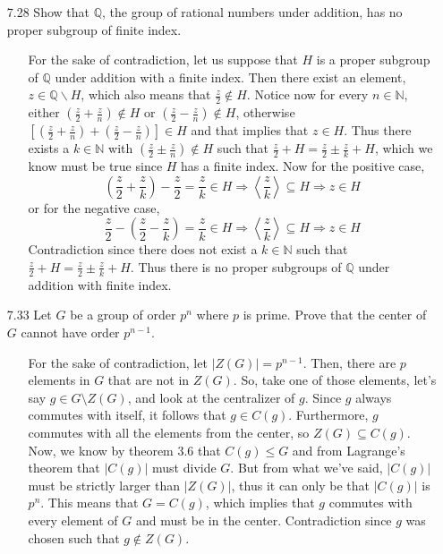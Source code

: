 \documentclass[12pt]{article}
\begin{document}
\begin{enumerate}
\item[7.28] Show that $\mathbb{Q}$, the group of rational numbers under addition, has no
proper subgroup of finite index.
\begin{enumerate}
\item[] For the sake of contradiction, let us suppose that $H$ is a proper subgroup of 
$\mathbb{Q}$ under addition with a finite index. Then there exist an 
element, $z \in \mathbb{Q}\backslash H$, which also means that $\frac{z}{2} \not\in H$. Notice now
for every $n \in \mathbb{N}$, either $(\frac{z}{2} + \frac{z}{n}) \not\in H$ or $(\frac{z}{2} - 
\frac{z}{n}) \not\in H$, otherwise $[(\frac{z}{2} + \frac{z}{n}) + (\frac{z}{2} - \frac{z}{n})] \in H$
and that implies that $z \in H$. Thus there exists a $k \in \mathbb{N}$ with
$(\frac{z}{2} \pm \frac{z}{n}) \not\in H$ such that $\frac{z}{2} + H = \frac{z}{2} \pm \frac{z}{k} + H$, which
we know must be true since $H$ has a finite index. 
Now for the positive case, 
\[ 
\left(\frac{z}{2} + \frac{z}{k}\right) - \frac{z}{2} = \frac{z}{k} \in H 
\Rightarrow \left\langle \frac{z}{k} \right\rangle \subseteq H \Rightarrow z \in H
\]
or for the negative case,
\[ 
\frac{z}{2} - \left(\frac{z}{2} - \frac{z}{k}\right) = \frac{z}{k} \in H 
\Rightarrow \left\langle \frac{z}{k} \right\rangle \subseteq H \Rightarrow z \in H
\]
Contradiction since there does not exist a $k \in \mathbb{N}$ such that \\
$\frac{z}{2} + H = \frac{z}{2} \pm \frac{z}{k} + H$. Thus there is no proper subgroups of 
$\mathbb{Q}$ under addition with finite index.
\end{enumerate}

\item[7.33] Let $G$ be a group of order $p^n$ where $p$ is prime. Prove that the center
of $G$ cannot have order $p^{n-1}$.
\begin{enumerate}
\item[] For the sake of contradiction, let $|Z(G)| = p^{n-1}$. Then, there are $p$ elements
in $G$ that are not in $Z(G)$. So, take one of those elements, let's say $g \in G\setminus Z(G)$,
and look at the centralizer of $g$. Since $g$ always commutes with itself, it follows that 
$g \in C(g)$. Furthermore, $g$ commutes with all the elements from the center, so
$Z(G) \subseteq C(g)$. Now, we know by theorem 3.6 that $C(g) \leq G$ and from Lagrange's 
theorem that $|C(g)|$ must divide $G$. But from what we've said, $|C(g)|$ must be strictly larger
than $|Z(G)|$, thus it can only be that $|C(g)|$ is $p^n$. This means that $G = C(g)$, which
implies that $g$ commutes with every element of $G$ and must be in the center. Contradiction since
$g$ was chosen such that $g \not\in Z(G)$.
\end{enumerate}


\end{enumerate}
\end{document}
